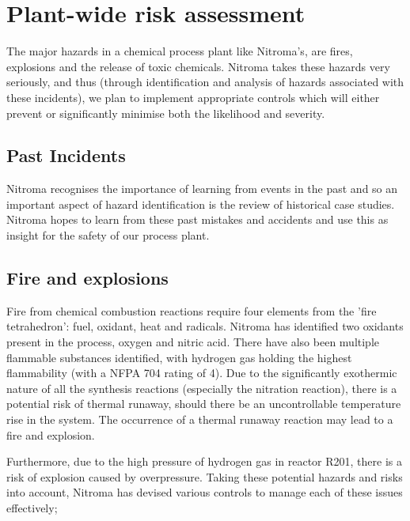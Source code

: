 \section{Plant-wide risk assessment}

The major hazards in  a chemical process plant like Nitroma’s, are fires, explosions and the release of toxic chemicals. Nitroma takes these hazards very seriously, and thus (through identification and analysis of hazards associated with these incidents), we plan to implement appropriate controls which will either prevent or significantly minimise both the likelihood and severity. 

\subsection{Past Incidents}

Nitroma recognises the importance of learning from events in the past and so an important aspect of hazard identification is the review of historical case studies. Nitroma hopes to learn from these past mistakes and accidents and use this as insight for the safety of our process plant.






\subsection{Fire and explosions}

Fire from chemical combustion reactions require four elements from the 'fire tetrahedron': fuel, oxidant, heat and radicals. Nitroma has identified two oxidants present in the process, oxygen and nitric acid. There have also been multiple flammable substances identified, with hydrogen gas holding the highest flammability (with a NFPA 704 rating of 4). Due to the significantly exothermic nature of all the synthesis reactions (especially the nitration reaction), there is a potential risk of thermal runaway, should there be an uncontrollable temperature rise in the system. The occurrence of a thermal runaway reaction may lead to a fire and explosion.  

Furthermore, due to the high pressure of hydrogen gas in reactor R201, there is a risk of explosion caused by overpressure. Taking these potential hazards and risks into account, Nitroma has devised various controls to manage each of these issues effectively; 


